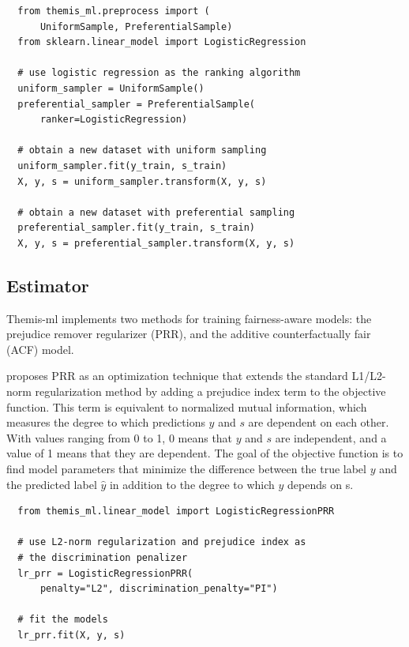 \documentclass{{interact/interact}}
\begin{document}
\begin{verbatim}
  from themis_ml.preprocess import (
      UniformSample, PreferentialSample)
  from sklearn.linear_model import LogisticRegression

  # use logistic regression as the ranking algorithm
  uniform_sampler = UniformSample()
  preferential_sampler = PreferentialSample(
      ranker=LogisticRegression)

  # obtain a new dataset with uniform sampling
  uniform_sampler.fit(y_train, s_train)
  X, y, s = uniform_sampler.transform(X, y, s)

  # obtain a new dataset with preferential sampling
  preferential_sampler.fit(y_train, s_train)
  X, y, s = preferential_sampler.transform(X, y, s)
\end{verbatim}

\subsection{Estimator}

Themis-ml implements two methods for training fairness-aware models: the
prejudice remover regularizer (PRR), and the additive counterfactually fair
(ACF) model.

\cite{kamishima2012fairness} proposes PRR as an optimization technique that
extends the standard L1/L2-norm regularization method \cite{ng2004feature,
ribeiro2016should} by adding a prejudice index term to the objective function.
This term is equivalent to normalized mutual information, which measures the
degree to which predictions \(y\) and \(s\) are dependent on each other. With
values ranging from 0 to 1, 0 means that \(y\) and \(s\) are independent, and a
value of 1 means that they are dependent. The goal of the objective function is
to find model parameters that minimize the difference between the true label
\(y\) and the predicted label \(\hat{y}\) in addition to the degree to which
\(y\) depends on s.

\begin{verbatim}
  from themis_ml.linear_model import LogisticRegressionPRR

  # use L2-norm regularization and prejudice index as
  # the discrimination penalizer
  lr_prr = LogisticRegressionPRR(
      penalty="L2", discrimination_penalty="PI")

  # fit the models
  lr_prr.fit(X, y, s)
\end{verbatim}
\end{document}
